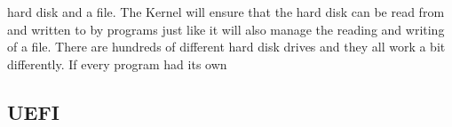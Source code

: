 hard disk and a
file. The Kernel will ensure that the hard disk can be read from and written
to by programs just like it will also manage the reading and writing of a
file. There are hundreds of different hard disk drives and they all work a
bit differently. If every program had its own 

\subsection{UEFI}
